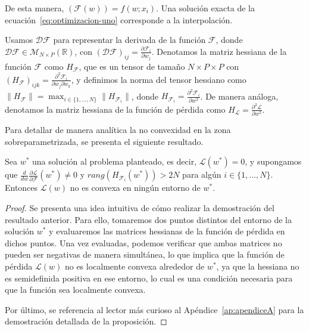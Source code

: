 De esta manera, $(\mathcal{F}(w)) = f(w; x_i)$. Una solución exacta de la ecuación~\eqref{eq:optimizacion-uno} corresponde a la interpolación.

Usamos $\mathcal{DF}$ para representar la derivada de la función $\mathcal{F}$, donde $\mathcal{DF} \in \mathcal{M}_{N \times P}(\mathbb{R})$, con $(\mathcal{DF})_{ij} = \frac{\partial \mathcal{F}_{i}}{\partial w_j}$. Denotamos la matriz hessiana de la función $\mathcal{F}$ como $H_{\mathcal{F}}$, que es un tensor de tamaño $N \times P \times P$ con $(H_{\mathcal{F}})_{ijk} = \frac{\partial^2 \mathcal{F}_{i}}{\partial w_j \partial w_k}$, y definimos la norma del tensor hessiano como $\| H_{\mathcal{F}} \| = \max_{i \in \{1, \ldots,N \}} \| H_{\mathcal{F}_{i}} \|$, donde $H_{\mathcal{F}_{i}} = \frac{\partial^2 \mathcal{F}_{i}}{\partial w^2}$. De manera análoga, denotamos la matriz hessiana de la función de pérdida como $H_{\mathcal{L}} = \frac{\partial^2 \mathcal{L}}{\partial w^2}$.

Para detallar de manera analítica la no convexidad en la zona sobreparametrizada, se presenta el siguiente resultado.

\begin{proposicion}\label{prop:non-conexity}
    Sea $w^{*}$ una solución al problema planteado, es decir, $\mathcal{L}(w^{*}) = 0$, y supongamos que $\frac{d}{dw}\frac{\partial \mathcal{L}}{\partial \mathcal{F}}(w^{*}) \neq 0$ y $rang(H_{\mathcal{F}_{i}}(w^{*})) > 2N$ para algún $i \in \{1, \ldots, N \}$. Entonces $\mathcal{L}(w)$ no es convexa en ningún entorno de $w^{*}$.
\end{proposicion}

\begin{proof}
    Se presenta una idea intuitiva de cómo realizar la demostración del resultado anterior. Para ello, tomaremos dos puntos distintos del entorno de la solución $w^*$ y evaluaremos las matrices hessianas de la función de pérdida en dichos puntos. Una vez evaluadas, podemos verificar que ambas matrices no pueden ser negativas de manera simultánea, lo que implica que la función de pérdida $\mathcal{L}(w)$ no es localmente convexa alrededor de $w^*$, ya que la hessiana no es semidefinida positiva en ese entorno, lo cual es una condición necesaria para que la función sea localmente convexa.

    Por último, se referencia al lector más curioso al Apéndice~\ref{ap:apendiceA} para la demostración detallada de la proposición.
\end{proof}

